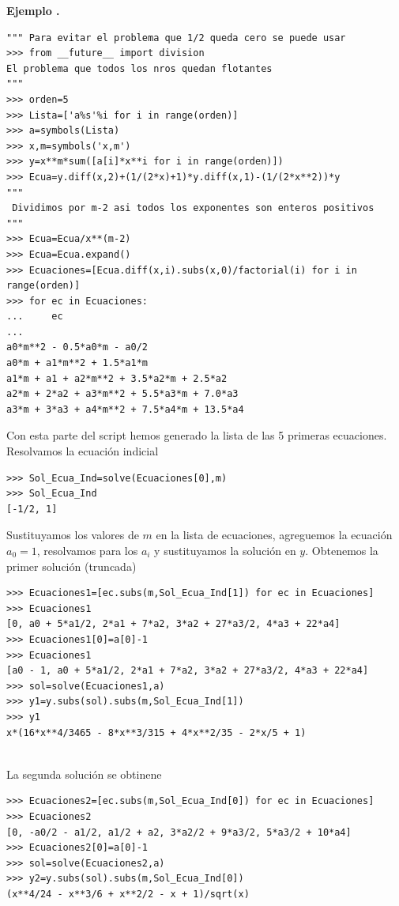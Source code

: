 \documentclass{article}
\newcounter{ejemplo_cont}
\newenvironment{ejemplo}{\noindent\textbf{Ejemplo  \arabic{ejemplo_cont}.} }{\addtocounter{ejemplo_cont}{1}}
\begin{document}
\begin{ejemplo}
\begin{lstlisting}
""" Para evitar el problema que 1/2 queda cero se puede usar
>>> from __future__ import division
El problema que todos los nros quedan flotantes
"""
>>> orden=5
>>> Lista=['a%s'%i for i in range(orden)]
>>> a=symbols(Lista)
>>> x,m=symbols('x,m')
>>> y=x**m*sum([a[i]*x**i for i in range(orden)])
>>> Ecua=y.diff(x,2)+(1/(2*x)+1)*y.diff(x,1)-(1/(2*x**2))*y
"""
 Dividimos por m-2 asi todos los exponentes son enteros positivos
"""
>>> Ecua=Ecua/x**(m-2)
>>> Ecua=Ecua.expand()
>>> Ecuaciones=[Ecua.diff(x,i).subs(x,0)/factorial(i) for i in range(orden)]
>>> for ec in Ecuaciones:
...     ec
... 
a0*m**2 - 0.5*a0*m - a0/2
a0*m + a1*m**2 + 1.5*a1*m
a1*m + a1 + a2*m**2 + 3.5*a2*m + 2.5*a2
a2*m + 2*a2 + a3*m**2 + 5.5*a3*m + 7.0*a3
a3*m + 3*a3 + a4*m**2 + 7.5*a4*m + 13.5*a4
\end{lstlisting}

Con esta parte del script hemos generado la lista de las 5 primeras ecuaciones.
Resolvamos la ecuación indicial

\begin{lstlisting}
>>> Sol_Ecua_Ind=solve(Ecuaciones[0],m)
>>> Sol_Ecua_Ind
[-1/2, 1]
\end{lstlisting}

Sustituyamos los valores de $m$ en la lista de ecuaciones, agreguemos la ecuación $a_0=1$, resolvamos para los $a_i$ y sustituyamos la solución en $y$. Obtenemos la primer solución (truncada) 
\begin{lstlisting}
>>> Ecuaciones1=[ec.subs(m,Sol_Ecua_Ind[1]) for ec in Ecuaciones]
>>> Ecuaciones1
[0, a0 + 5*a1/2, 2*a1 + 7*a2, 3*a2 + 27*a3/2, 4*a3 + 22*a4]
>>> Ecuaciones1[0]=a[0]-1
>>> Ecuaciones1
[a0 - 1, a0 + 5*a1/2, 2*a1 + 7*a2, 3*a2 + 27*a3/2, 4*a3 + 22*a4]
>>> sol=solve(Ecuaciones1,a)
>>> y1=y.subs(sol).subs(m,Sol_Ecua_Ind[1])
>>> y1
x*(16*x**4/3465 - 8*x**3/315 + 4*x**2/35 - 2*x/5 + 1)


\end{lstlisting}
La segunda solución se obtinene
\begin{lstlisting}
>>> Ecuaciones2=[ec.subs(m,Sol_Ecua_Ind[0]) for ec in Ecuaciones]
>>> Ecuaciones2
[0, -a0/2 - a1/2, a1/2 + a2, 3*a2/2 + 9*a3/2, 5*a3/2 + 10*a4]
>>> Ecuaciones2[0]=a[0]-1
>>> sol=solve(Ecuaciones2,a)
>>> y2=y.subs(sol).subs(m,Sol_Ecua_Ind[0])
(x**4/24 - x**3/6 + x**2/2 - x + 1)/sqrt(x)

\end{lstlisting}



\end{ejemplo}
\end{document}
